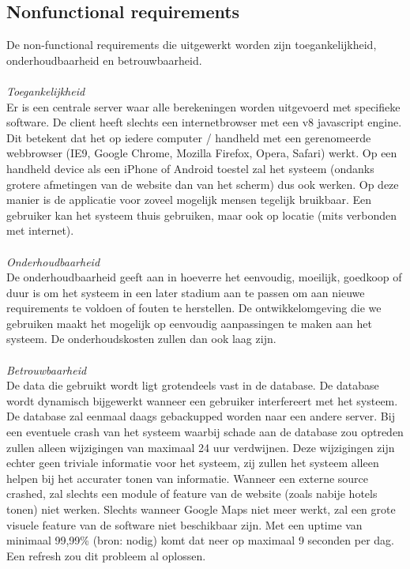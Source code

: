 \documentclass[a4paper,10pt]{article}
\begin{document}
		\subsection{Nonfunctional requirements}
			De non-functional requirements die uitgewerkt worden zijn toegankelijkheid, onderhoudbaarheid en betrouwbaarheid.\\	\\
			\textit{Toegankelijkheid}\\
			Er is een centrale server waar alle berekeningen worden uitgevoerd met specifieke software. De client heeft slechts een internetbrowser met een v8 javascript engine. Dit betekent dat het op iedere computer / handheld met een gerenomeerde webbrowser (IE9, Google Chrome, Mozilla Firefox, Opera, Safari) werkt. Op een handheld device als een iPhone of Android toestel zal het systeem (ondanks grotere afmetingen van de website dan van het scherm) dus ook werken. Op deze manier is de applicatie voor zoveel mogelijk mensen tegelijk bruikbaar. Een gebruiker kan het systeem thuis gebruiken, maar ook op locatie (mits verbonden met internet).\\ \\
			\textit{Onderhoudbaarheid}\\
			De onderhoudbaarheid geeft aan in hoeverre het eenvoudig, moeilijk, goedkoop of duur is om het systeem in een later stadium aan te passen om aan nieuwe requirements te voldoen of fouten te herstellen. De ontwikkelomgeving die we gebruiken maakt het mogelijk op eenvoudig aanpassingen te maken aan het systeem. De onderhoudskosten zullen dan ook laag zijn.\\ \\
			\textit{Betrouwbaarheid}\\
			De data die gebruikt wordt ligt grotendeels vast in de database. De database wordt dynamisch bijgewerkt wanneer een gebruiker interfereert met het systeem. De database zal eenmaal daags gebackupped worden naar een andere server. Bij een eventuele crash van het systeem waarbij schade aan de database zou optreden zullen alleen wijzigingen van maximaal 24 uur verdwijnen. Deze wijzigingen zijn echter geen triviale informatie voor het systeem, zij zullen het systeem alleen helpen bij het accurater tonen van informatie. Wanneer een externe source crashed, zal slechts een module of feature van de website (zoals nabije hotels tonen) niet werken. Slechts wanneer Google Maps niet meer werkt, zal een grote visuele feature van de software niet beschikbaar zijn. Met een uptime van minimaal 99,99\% (bron: nodig) komt dat neer op maximaal 9 seconden per dag. Een refresh zou dit probleem al oplossen.
			
\end{document}
